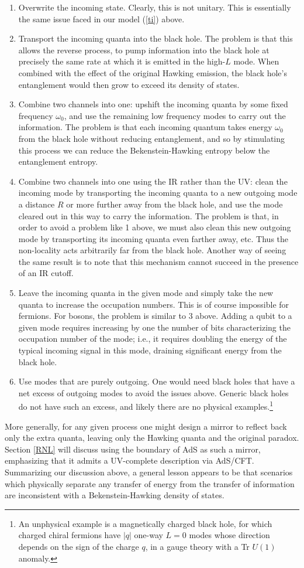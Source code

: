 \documentclass[12pt]{article}
\begin{document}
{\begin{enumerate}
\item
Overwrite the incoming state.  Clearly, this is not unitary.  This is essentially the same issue faced in our model (\ref{ti}) above.
\item
Transport the incoming quanta into the black hole.  The problem is that this allows the reverse process, to pump information into the black hole at precisely the same rate at which it is emitted in the high-$L$ mode.  When combined with the effect of the original Hawking emission, the black hole's entanglement would then grow to exceed its density of states.
\item
Combine two channels into one: upshift the incoming quanta by some fixed frequency $\omega_0$, and use the remaining low frequency modes to carry out the information.  The problem is that each incoming quantum takes energy $\omega_0$ from the black hole without reducing entanglement, and so by stimulating this process we can reduce the Bekenstein-Hawking entropy below the entanglement entropy.
\item
Combine two channels into  one using the IR rather than the UV: clean the incoming mode by transporting the incoming quanta to a new outgoing mode a distance $R$ or more further away from the black hole, and use the mode cleared out in this way to carry the information.  The problem is that, in order to avoid a problem like 1 above, we must also clean this new outgoing mode by transporting its incoming quanta even farther away, etc.  Thus the non-locality acts arbitrarily far from the black hole.  Another way of seeing the same result is to note that this mechanism cannot succeed in the presence of an IR cutoff.
\item
Leave the incoming quanta in the given mode and simply take the new quanta to increase the occupation numbers.  This is of course impossible for fermions.  For bosons, the problem is similar to 3 above.  Adding a qubit to a given mode requires increasing by one the number of bits characterizing the occupation number of the mode; i.e., it requires doubling the energy of the typical incoming signal in this mode, draining significant energy from the black hole.
\item
Use modes that are purely outgoing.  One would need black holes that have a net excess of outgoing modes to avoid the issues above.  Generic black holes do not have such an excess, and likely there are no physical examples.\footnote{An unphysical example is a magnetically charged black hole, for which charged chiral fermions have $|q|$ one-way $L=0$ modes whose direction depends on the sign of the charge $q$,  in a gauge theory with a Tr $U(1)$ anomaly.}
\end{enumerate}
More generally, for any given process one might design a mirror to reflect back only the extra quanta, leaving only the Hawking quanta and the original paradox.  Section \ref{RNL} will discuss using the boundary of AdS as such a mirror, emphasizing that it admits a UV-complete description via AdS/CFT. Summarizing our discussion above, a general lesson appears to be that scenarios which physically separate any transfer of energy from the transfer of information are inconsistent with a Bekenstein-Hawking density of states.

}
\end{document}
